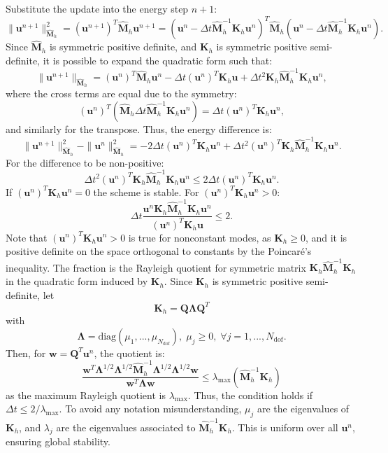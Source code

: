 \documentclass{article}
\renewcommand{\u}{\mathbf{u}}
\newcommand{\K}{\mathbf{K}_h}
\newcommand{\M}{\hat{\mathbf{M}}_h}
\begin{document}
Substitute the update into the energy step $n+1$:
\begin{equation}
    \nonumber
    \| \u^{n+1}\|_{\M}^2= (\u^{n+1})^T \M \u^{n+1} = \left( \u^n-\Delta t \M^{-1}\K \u^n \right)^T\M \left( \u^n-\Delta t \M^{-1}\K \u^n \right).
\end{equation}
Since $\M$ is symmetric positive definite, and $\K$ is symmetric positive semi-definite, it is possible to expand the quadratic form such that:
\begin{equation}
    \nonumber
    \| \u^{n+1} \|_{\M} = (\u^n)^T \M \u^n - \Delta t (\u^n)^T \K \u + \Delta t^2 \K \M^{-1} \K \u^n,
\end{equation}
where the cross terms are equal due to the symmetry:
\begin{equation}
    \nonumber
    (\u^n)^T \left( \M \Delta t \M^{-1} \K \u^n \right) = \Delta t (\u^n)^T \K \u^n,
\end{equation}
and similarly for the transpose. Thus, the energy difference is:
\begin{equation}
    \nonumber
    \|\u^{n+1}\|^2_{\M} - \| \u^n \|^2_{\M} = -2 \Delta t (\u^n)^T\K \u^n + \Delta t^2 (\u^n)^T \K \M^{-1}\K \u^n.
\end{equation}
For the difference to be non-positive:
\begin{equation}
    \nonumber
    \Delta t^2 (\u^n)^T \K \M^{-1}\K \u^n \leq 2 \Delta t (\u^n)^T \K \u^n.
\end{equation}
If $(\u^n)^T \K \u^n = 0$ the scheme is stable. For $(\u^n)^T \K \u^n > 0$:
\begin{equation}
    \nonumber
    \Delta t \frac{\u^n \K \M^{-1}\K \u^n}{(\u^n)^T \K \u} \leq 2.
\end{equation}
Note that $(\u^n)^T \K \u^n > 0$ is true for nonconstant modes, as $\K \geq 0$, and it is positive definite on the space orthogonal to constants by the Poincaré's inequality. The fraction is the Rayleigh quotient for symmetric matrix $\K \M^{-1} \K$ in the quadratic form induced by $\K$. Since $\K$ is symmetric positive semi-definite, let 
\begin{equation}
    \nonumber
    \K = \mathbf{Q} \mathbf{\Lambda} \mathbf{Q}^T
\end{equation}
with 
\begin{equation}
    \nonumber
    \mathbf{\Lambda} = \text{diag} (\mu_1, ..., \mu_{N_{\text{dof}}}), \; \mu_j \geq 0, \; \forall j = 1,..., N_{\text{dof}}.
\end{equation}
Then, for $\mathbf{w} = \mathbf{Q}^T \u^n$, the quotient is:
\begin{equation}
    \nonumber
    \frac{\mathbf{w}^T \mathbf{\Lambda}^{1/2} \mathbf{\Lambda}^{1/2} \M^{-1} \mathbf{\Lambda}^{1/2} \mathbf{\Lambda}^{1/2} \mathbf{w}}{\mathbf{w}^T \mathbf{\Lambda} \mathbf{w}} \leq \lambda_{\max} \left( \M^{-1} \K \right)
\end{equation}
as the maximum Rayleigh quotient is $\lambda_{\max}$. Thus, the condition holds if $\Delta t  \leq 2/\lambda_{\max}$. To avoid any notation misunderstanding, $\mu_j$ are the eigenvalues of $\K$, and $\lambda_j$ are the eigenvalues associated to $\M^{-1} \K$. This is uniform over all $\u^n$, ensuring global stability.
\end{document}
